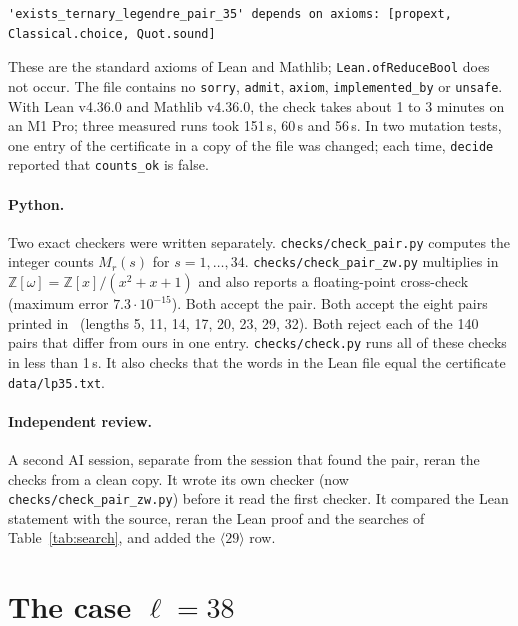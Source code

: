 \documentclass[11pt]{article}
\theoremstyle{remark}
\newcommand{\Z}{\mathbb{Z}}
\begin{document}
\begin{Verbatim}[fontsize=\footnotesize]
'exists_ternary_legendre_pair_35' depends on axioms: [propext, Classical.choice, Quot.sound]
\end{Verbatim}
These are the standard axioms of Lean and Mathlib; \texttt{Lean.ofReduceBool} does not occur. The file contains no \texttt{sorry}, \texttt{admit}, \texttt{axiom}, \texttt{implemented\_by} or \texttt{unsafe}. With Lean v4.36.0 and Mathlib v4.36.0, the check takes about 1 to 3 minutes on an M1 Pro; three measured runs took 151\,s, 60\,s and 56\,s. In two mutation tests, one entry of the certificate in a copy of the file was changed; each time, \texttt{decide} reported that \texttt{counts\_ok} is false.

\paragraph{Python.} Two exact checkers were written separately. \texttt{checks/check\_pair.py} computes the integer counts $M_r(s)$ for $s = 1, \dots, 34$. \texttt{checks/check\_pair\_zw.py} multiplies in $\Z[\omega] = \Z[x]/(x^2 + x + 1)$ and also reports a floating-point cross-check (maximum error $7.3 \cdot 10^{-15}$). Both accept the pair. Both accept the eight pairs printed in~\cite{KLW} (lengths 5, 11, 14, 17, 20, 23, 29, 32). Both reject each of the 140 pairs that differ from ours in one entry. \texttt{checks/check.py} runs all of these checks in less than 1\,s. It also checks that the words in the Lean file equal the certificate \texttt{data/lp35.txt}.

\paragraph{Independent review.} A second AI session, separate from the session that found the pair, reran the checks from a clean copy. It wrote its own checker (now \texttt{checks/check\_pair\_zw.py}) before it read the first checker. It compared the Lean statement with the source, reran the Lean proof and the searches of Table~\ref{tab:search}, and added the $\langle 29\rangle$ row.

\section{The case \texorpdfstring{$\ell = 38$}{l = 38}}\label{sec:38}
\end{document}
